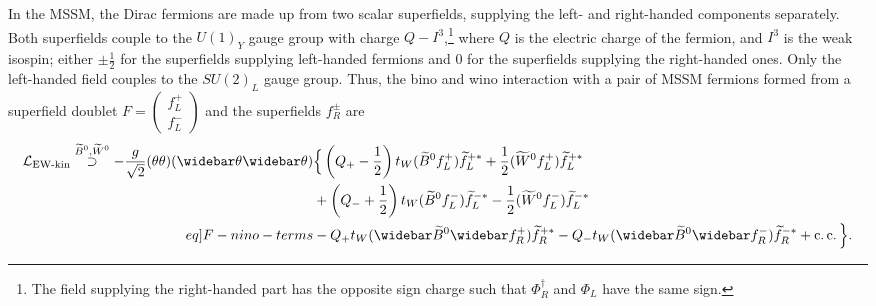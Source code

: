 \documentclass[english, notitlepage]{article}
\begin{document}
                In the MSSM, the Dirac fermions are made up from two scalar superfields, supplying the left- and right-handed components separately. Both superfields couple to the ${U(1)}_Y$ gauge group with charge $Q-I^3$,\footnote{The field supplying the right-handed part has the opposite sign charge such that $\Phi^\dag_R$ and $\Phi_L$ have the same sign.} where $Q$ is the electric charge of the fermion, and $I^3$ is the weak isospin; either $\pm \frac{1}{2}$ for the superfields supplying left-handed fermions and 0 for the superfields supplying the right-handed ones. Only the left-handed field couples to the ${SU(2)}_L$ gauge group. Thus, the bino and wino interaction with a pair of MSSM fermions formed from a superfield doublet $F = \begin{pmatrix} f_L^+ \\ f_L^- \end{pmatrix}$ and the superfields $f_R^\pm$ are
                \begin{align} \nonumber
                    \L_{\text{EW-kin}} \stackrel{\bino, \wino}{\supset} -\frac{g}{\sqrt{2}} (\theta\theta)(\wbar\theta\wbar\theta) &\Big\{ \pclosed{Q_+-\frac{1}{2}}t_W (\bino f_L^+) \wtilde{f}_L^{+*} + \frac{1}{2} (\wino f_L^+) \wtilde{f}_L^{+*} \\ \nonumber
                    &+ \pclosed{Q_-+\frac{1}{2}}t_W (\bino f_L^-)\wtilde{f}_L^{-*} - \frac{1}{2} (\wino f_L^-)\wtilde{f}_L^{-*} \\ \label[eq]{F-nino-terms}
                    &- Q_+t_W (\wbar{\wtilde{B}}^0\wbar{f}_R^+)\wtilde{f}_R^{+*} - Q_-t_W (\wbar{\wtilde{B}}^0\wbar{f}_R^-)\wtilde{f}_R^{-*} + \cc \Big\}.
                \end{align}
                
\end{document}
